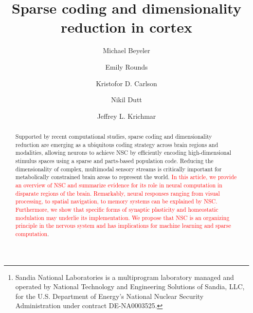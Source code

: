 \documentclass[review,12pt,sort&compress,openany,oneside]{elsarticle}
\begin{document}
\begin{frontmatter}

\title{Sparse coding and dimensionality reduction in cortex}

\author[UCI,UW]{Michael Beyeler}
\author[UCI]{Emily Rounds}
\author[Sandia]{Kristofor D. Carlson}
\author[UCI]{Nikil Dutt}
\author[UCI]{Jeffrey L. Krichmar}
%
\address[UCI]{University of California, Irvine, Irvine, CA, USA}
\address[UW]{University of Washington, Seattle, WA, USA}
\address[Sandia]{Sandia National Laboratories\footnote[**]{Sandia National Laboratories is a multiprogram laboratory managed and operated by National Technology and Engineering Solutions of Sandia, LLC, for the U.S. Department of Energy's National Nuclear Security Administration under contract DE-NA0003525.}, Albuquerque, NM, USA}


\begin{abstract}
Supported by recent computational studies, sparse coding and
dimensionality reduction are emerging as a ubiquitous coding strategy 
across brain regions and modalities,
allowing neurons to achieve \ac{NSC}
by efficiently encoding high-dimensional stimulus spaces
using a sparse and parts-based population code.
Reducing the dimensionality of complex, multimodal sensory streams 
is critically important for metabolically constrained brain areas 
to represent the world. \textcolor{red}{In this article, we provide an overview of \ac{NSC} and summarize evidence for its role in neural computation in disparate regions of the brain. Remarkably, neural responses ranging from visual processing, to spatial navigation, to memory systems can be explained by \ac{NSC}. Furthermore, we show that specific forms of synaptic plasticity and homeostatic modulation may underlie its implementation. We  propose that NSC is an organizing principle in the nervous system and has implications for machine learning and sparse computation}.
\end{abstract}


\end{frontmatter}
\end{document}
